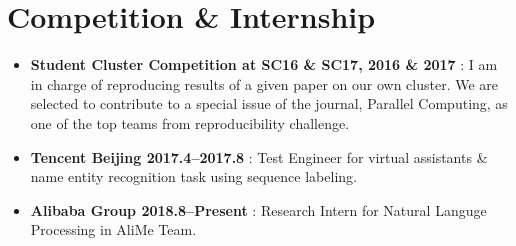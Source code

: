 \documentclass[letterpaper]{article}
\begin{document}
\section*{Competition \& Internship}
\begin{itemize}
  \item \textbf{Student Cluster Competition at SC16 \& SC17, 2016 \& 2017} : I am in charge of reproducing results of a given paper on our own cluster. We are selected to contribute to a special issue of the journal, Parallel Computing, as one of the top teams from reproducibility challenge.
  \item \textbf{Tencent Beijing 2017.4--2017.8} : Test Engineer for virtual assistants \& name entity recognition task  using sequence labeling.
  \item \textbf{Alibaba Group 2018.8--Present} : Research Intern for Natural Languge Processing in AliMe Team.
\end{itemize}
\end{document}
